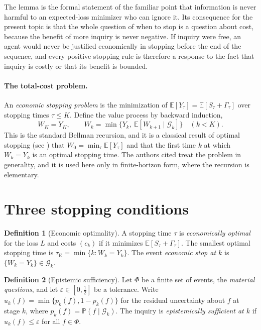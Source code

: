 \documentclass[11pt]{article}
\newcommand{\G}{\mathcal G}
\newcommand{\PP}{\mathbb P}
\newcommand{\E}{\mathbb E}
\newcommand{\tE}{\tau_{\mathrm E}}
\theoremstyle{plain}
\theoremstyle{definition}
\newtheorem{definition}{Definition}
\begin{document}
The lemma is the formal statement of the familiar point that information is never harmful to an expected-loss minimizer who can ignore it. Its consequence for the present topic is that the whole question of when to stop is a question about cost, because the benefit of more inquiry is never negative. If inquiry were free, an agent would never be justified economically in stopping before the end of the sequence, and every positive stopping rule is therefore a response to the fact that inquiry is costly or that its benefit is bounded.

\paragraph{The total-cost problem.} An \emph{economic stopping problem} is the minimization of $\E[Y_\tau]=\E[S_\tau+\Gamma_\tau]$ over stopping times $\tau\le K$. Define the value process by backward induction,
\[
W_K=Y_K,\qquad W_k=\min\bigl\{Y_k,\ \E[W_{k+1}\mid\G_k]\bigr\}\quad(k<K).
\]
This is the standard Bellman recursion, and it is a classical result of optimal stopping (see \cite{chow1971great,ferguson}) that $W_0=\min_\tau\E[Y_\tau]$ and that the first time $k$ at which $W_k=Y_k$ is an optimal stopping time. The authors cited treat the problem in generality, and it is used here only in finite-horizon form, where the recursion is elementary.

\section{Three stopping conditions}\label{sec:three}

\begin{definition}[Economic optimality]\label{def:econ}
A stopping time $\tau$ is \emph{economically optimal} for the loss $L$ and costs $(c_k)$ if it minimizes $\E[S_\tau+\Gamma_\tau]$. The smallest optimal stopping time is $\tE=\min\{k:W_k=Y_k\}$. The event \emph{economic stop at $k$} is $\{W_k=Y_k\}\in\G_k$.
\end{definition}

\begin{definition}[Epistemic sufficiency]\label{def:epi}
Let $\Phi$ be a finite set of events, the \emph{material questions}, and let $\varepsilon\in[0,\tfrac12]$ be a tolerance. Write $u_k(f)=\min\{p_k(f),1-p_k(f)\}$ for the residual uncertainty about $f$ at stage $k$, where $p_k(f)=\PP(f\mid\G_k)$. The inquiry is \emph{epistemically sufficient at $k$} if $u_k(f)\le\varepsilon$ for all $f\in\Phi$.
\end{definition}
\end{document}
